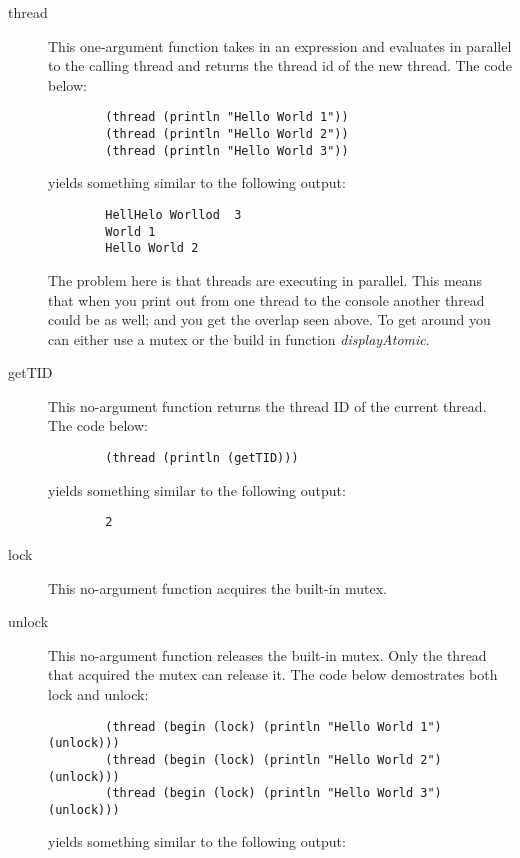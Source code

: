 \begin{description}
\item[thread] This one-argument function takes in an expression and evaluates in parallel to the calling thread and returns the thread id of the new thread.  The code below:
    \begin{verbatim}
        (thread (println "Hello World 1"))
        (thread (println "Hello World 2"))
        (thread (println "Hello World 3"))
    \end{verbatim} 

    yields something similar to the following output:

    \begin{verbatim}
        HellHelo Worllod  3
        World 1
        Hello World 2
    \end{verbatim} 

    The problem here is that threads are executing in parallel.  This means that when you print out from one thread to the console another thread could be as well; and you get the overlap seen above.  To get around you can either use a mutex or the build in function {\it displayAtomic}.

\item[getTID] This no-argument function returns the thread ID of the current thread.  The code below:

    \begin{verbatim}
        (thread (println (getTID)))
    \end{verbatim}


    yields something similar to the following output:

    \begin{verbatim}
        2
    \end{verbatim}

\item[lock] This no-argument function acquires the built-in mutex.
\item[unlock] This no-argument function releases the built-in mutex.
Only the thread that acquired the mutex can release it.  The code below 
demostrates both lock and unlock:

    \begin{verbatim}
        (thread (begin (lock) (println "Hello World 1") (unlock)))
        (thread (begin (lock) (println "Hello World 2") (unlock)))
        (thread (begin (lock) (println "Hello World 3") (unlock)))
    \end{verbatim} 

    yields something similar to the following output:


\end{description}

